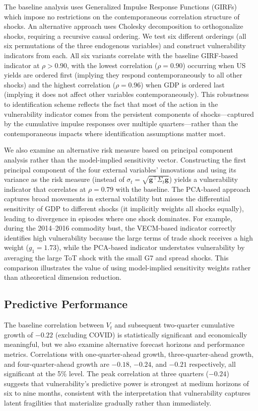 \documentclass[12pt,a4paper]{article}
\numberwithin{equation}{section}
\theoremstyle{definition}
\theoremstyle{remark}
\newcommand{\vect}[1]{\boldsymbol{#1}}
\begin{document}
The baseline analysis uses Generalized Impulse Response Functions (GIRFs) which impose no restrictions on the contemporaneous correlation structure of shocks. An alternative approach uses Cholesky decomposition to orthogonalize shocks, requiring a recursive causal ordering. We test six different orderings (all six permutations of the three endogenous variables) and construct vulnerability indicators from each. All six variants correlate with the baseline GIRF-based indicator at $\rho > 0.90$, with the lowest correlation ($\rho=0.90$) occurring when US yields are ordered first (implying they respond contemporaneously to all other shocks) and the highest correlation ($\rho=0.96$) when GDP is ordered last (implying it does not affect other variables contemporaneously). This robustness to identification scheme reflects the fact that most of the action in the vulnerability indicator comes from the persistent components of shocks---captured by the cumulative impulse responses over multiple quarters---rather than the contemporaneous impacts where identification assumptions matter most.

We also examine an alternative risk measure based on principal component analysis rather than the model-implied sensitivity vector. Constructing the first principal component of the four external variables' innovations and using its variance as the risk measure (instead of $\sigma_t = \sqrt{\vect{g}^\top \Sigma_t \vect{g}}$) yields a vulnerability indicator that correlates at $\rho=0.79$ with the baseline. The PCA-based approach captures broad movements in external volatility but misses the differential sensitivity of GDP to different shocks (it implicitly weights all shocks equally), leading to divergence in episodes where one shock dominates. For example, during the 2014--2016 commodity bust, the VECM-based indicator correctly identifies high vulnerability because the large terms of trade shock receives a high weight ($g_1=1.73$), while the PCA-based indicator understates vulnerability by averaging the large ToT shock with the small G7 and spread shocks. This comparison illustrates the value of using model-implied sensitivity weights rather than atheoretical dimension reduction.


\subsection{Predictive Performance}

The baseline correlation between $V_t$ and subsequent two-quarter cumulative growth of $-0.22$ (excluding COVID) is statistically significant and economically meaningful, but we also examine alternative forecast horizons and performance metrics. Correlations with one-quarter-ahead growth, three-quarter-ahead growth, and four-quarter-ahead growth are $-0.18$, $-0.24$, and $-0.21$ respectively, all significant at the 5\% level. The peak correlation at three quarters ($-0.24$) suggests that vulnerability's predictive power is strongest at medium horizons of six to nine months, consistent with the interpretation that vulnerability captures latent fragilities that materialize gradually rather than immediately.
\end{document}
